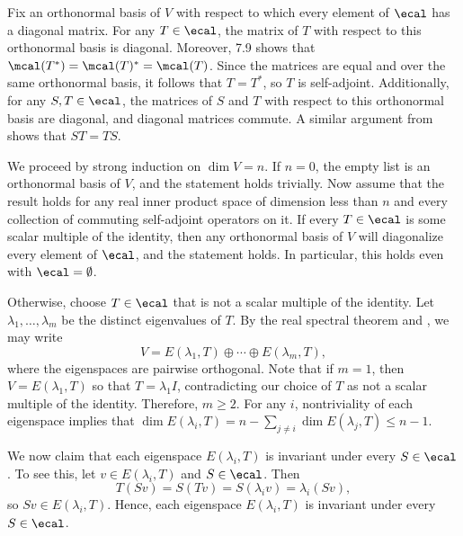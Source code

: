 \begin{soliff}
    \rightimp Fix an orthonormal basis of $V$ with respect to which every element of $\ecal$ has a diagonal matrix.
    For any $T \in \ecal$, the matrix of $T$ with respect to this orthonormal basis is diagonal.
    Moreover, 7.9 shows that $\mcal(T^\ast) = \mcal(T)^\ast = \mcal(T)$.
    Since the matrices are equal and over the same orthonormal basis, it follows that $T = T^\ast$, so $T$ is self-adjoint.
    Additionally, for any $S, T \in \ecal$, the matrices of $S$ and $T$ with respect to this orthonormal basis are diagonal, and diagonal matrices commute.
    A similar argument from  shows that $ST = TS$.

    \leftimp We proceed by strong induction on $\dim V = n$.
    If $n = 0$, the empty list is an orthonormal basis of $V$, and the statement holds trivially.
    Now assume that the result holds for any real inner product space of dimension less than $n$ and every collection of commuting self-adjoint operators on it.
    If every $T \in \ecal$ is some scalar multiple of the identity, then any orthonormal basis of $V$ will diagonalize every element of $\ecal$, and the statement holds.
    In particular, this holds even with $\ecal = \emptyset$.

    Otherwise, choose $T \in \ecal$ that is not a scalar multiple of the identity.
    Let $\lambda_1, \ldots, \lambda_m$ be the distinct eigenvalues of $T$.
    By the real spectral theorem and , we may write
    \[
        V = E(\lambda_1, T) \oplus \cdots \oplus E(\lambda_m, T),
    \]
    where the eigenspaces are pairwise orthogonal.
    Note that if $m = 1$, then $V = E(\lambda_1, T)$ so that $T = \lambda_1 I$, contradicting our choice of $T$ as not a scalar multiple of the identity.
    Therefore, $m \geq 2$.
    For any $i$, nontriviality of each eigenspace implies that $\dim E(\lambda_i, T) = n - \sum_{j \neq i} \dim E(\lambda_j, T) \leq n - 1$.

    We now claim that each eigenspace $E(\lambda_i, T)$ is invariant under every $S \in \ecal$.
    To see this, let $v \in E(\lambda_i, T)$ and $S \in \ecal$.
    Then
    \[
        T(Sv) = S(Tv) = S(\lambda_i v) = \lambda_i (Sv),
    \]
    so $Sv \in E(\lambda_i, T)$.
    Hence, each eigenspace $E(\lambda_i, T)$ is invariant under every $S \in \ecal$.


\end{soliff}
